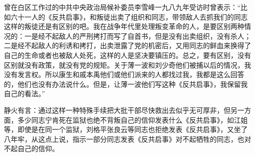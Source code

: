 \begin{maonote}
曾在白区工作过的中共中央政治局候补委员李雪峰一九八九年受访时曾表示：“比如六十一人的《反共启事》，和叛徒出卖了组织和同志，带领敌人去抓我们的同志这样的叛徒还是有区别的吧。我在战争年代里处理叛变革命的人，是要区别两种情况的：一是经不起敌人的严刑拷打而写了自首书，但是没有出卖组织，没有杀人；二是经不起敌人的利诱和拷打，出卖泄露了党的机密后，又用同志的鲜血来换得了自己的生命或者也被敌人处死，这样的人是坚决要镇压的。总之，要有区别，没有区别就没有政策，就没有党的规矩。关于薄一波和刘少奇他们被捕以后的情况，我没有发言权。所以康生和戚本禹他们或他们派来的人都找过我，我都是这么回答的，他们也没有办法说什么。但是，让薄一波他们写这种《反共启事》，我保留我自己的看法。”

静火有言：通过这样一种特殊手续把大批干部尽快救出去似乎无可厚非，但另一方面，多少同志宁肯死在监狱也绝不背叛自己的信仰发表什么《反共启事》，如江姐等，即使是在同一个监狱，刘格平张良云等同志也拒绝发表《反共启事》，又坐了八年牢，从这点上说，指示一部分同志发表《反共启事》对不起牺牲的同志，也对不起自己的信仰。
\end{maonote}
